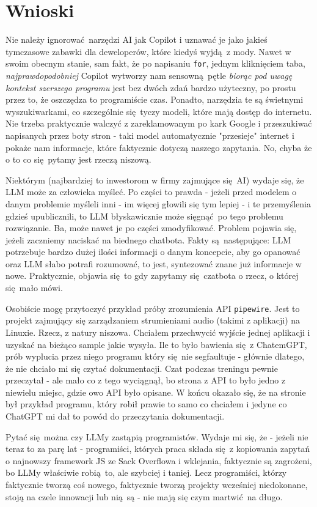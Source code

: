 	\newpage
\section{Wnioski}	%

Nie należy ignorować narzędzi AI jak Copilot i uznawać je jako jakieś tymczasowe zabawki dla deweloperów, które kiedyś wyjdą z mody. Nawet w swoim obecnym stanie, sam fakt, że po napisaniu \texttt{for}, jednym kliknięciem taba, \textit{najprawdopodobniej} Copilot wytworzy nam sensowną pętle \textit{biorąc pod uwagę kontekst szerszego programu} jest bez dwóch zdań bardzo użyteczny, po prostu przez to, że oszczędza to programiście czas. Ponadto, narzędzia te są świetnymi wyszukiwarkami, co szczególnie się tyczy modeli, które mają dostęp do internetu. Nie trzeba praktycznie walczyć z zareklamowanym po kark Google i przeszukiwać napisanych przez boty stron - taki model automatycznie "przesieje" internet i pokaże nam informacje, które faktycznie dotyczą naszego zapytania. No, chyba że o to co się pytamy jest rzeczą niszową.

Niektórym (najbardziej to inwestorom w firmy zajmujące się AI) wydaje się, że LLM może za człowieka myśleć. Po części to prawda - jeżeli przed modelem o danym problemie myśleli inni - im więcej głowili się tym lepiej - i te przemyślenia gdzieś upublicznili, to LLM błyskawicznie może sięgnąć po tego problemu rozwiązanie. Ba, może nawet je po części zmodyfikować. Problem pojawia się, jeżeli zaczniemy naciskać na biednego chatbota. Fakty są następujące: LLM potrzebuje bardzo dużej ilości informacji o danym koncepcie, aby go opanować oraz LLM słabo potrafi rozumować, to jest, syntezować znane już informacje w nowe. Praktycznie, objawia się to gdy zapytamy się czatbota o rzecz, o której się mało mówi. 

Osobiście mogę przytoczyć przykład próby zrozumienia API \texttt{pipewire}\cite{pipewiresite}. Jest to projekt zajmujący się zarządzaniem strumieniami audio (takimi z aplikacji) na Linuxie. Rzecz, z natury niszowa. Chciałem przechwycić wyjście jednej aplikacji i uzyskać na bieżąco sample jakie wysyła. Ile to było bawienia się z ChatemGPT, prób wyplucia przez niego programu który się nie segfaultuje - głównie dlatego, że nie chciało mi się czytać dokumentacji. Czat podczas treningu pewnie przeczytał - ale mało co z tego wyciągnął, bo strona z API to było jedno z niewielu miejsc, gdzie owo API było opisane. W końcu okazało się, że na stronie był przykład programu, który robił prawie to samo co chciałem i jedyne co ChatGPT mi dał to powód do przeczytania dokumentacji. 

Pytać się można czy LLMy zastąpią programistów. Wydaje mi się, że - jeżeli nie teraz to za parę lat - programiści, których praca składa się z kopiowania zapytań o najnowszy framework JS ze Sack Overflowa i wklejania, faktycznie są zagrożeni, bo LLMy właściwie robią to, ale szybciej i taniej. Lecz programiści, którzy faktycznie tworzą coś nowego, faktycznie tworzą projekty wcześniej niedokonane, stoją na czele innowacji lub nią są - nie mają się czym martwić na długo.
